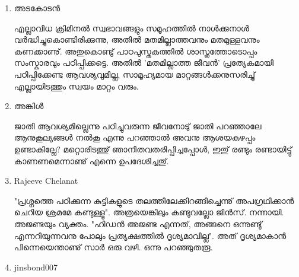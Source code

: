 \begin{enumerate}

\item{അടകോടന്‍}

എല്ലാവിധ ക്രിമിനല്‍ സ്വഭാവങ്ങളും സമൂഹത്തില്‍ നാള്‍ക്കുനാള്‍ വര്‍ദ്ധിച്ചുകൊണ്ടിരിക്കുന്നു, 
അതില്‍ മതമില്ലാത്തവനും മതമുള്ളവനും കണക്കാണു്. അതുകൊണ്ടു് പാഠപുസ്തകത്തില്‍ ശാസ്ത്രത്തോടൊപ്പം സംസ്കാരവും 
പഠിപ്പിക്കട്ടെ. അതില്‍ 'മതമില്ലാത്ത ജീവന്‍' പ്രത്യേകമായി പഠിപ്പിക്കേണ്ട ആവശ്യവുമില്ല, സാമൂഹ്യമായ മാറ്റങ്ങള്‍ക്കനുസരിച്ചു് 
എല്ലായിടത്തും സ്വയം മാറ്റം വരും.

\item{അങ്കിള്‍}

ജാതി ആവശ്യമില്ലെന്നു പഠിച്ചുവരുന്ന ജീവനോടു് ജാതി പറഞ്ഞാലേ ആനുകൂല്യങ്ങള്‍ നല്‍കൂ എന്നു പറഞ്ഞാല്‍ അവനു 
ആശയകുഴപ്പം ഉണ്ടാകില്ലേ? മറ്റൊരിടത്തു് ഞാനിതവതരിപ്പിച്ചപ്പോള്‍, ഇതു് രണ്ടും രണ്ടായിട്ടു് കാണണമെന്നാണു് എന്നെ 
ഉപദേശിച്ചതു്.

\item{Rajeeve Chelanat}

"പ്രശ്നത്തെ പഠിക്കുന്ന കുട്ടികളുടെ തലത്തിലേക്കിറങ്ങിച്ചെന്നു് അപഗ്രഥിക്കാന്‍ ചെറിയ ശ്രമമേ കണ്ടുള്ളൂ". അത്രയെങ്കിലും 
കണ്ടുവല്ലോ ജിന്‍സ്. നന്നായി. അജണ്ടയും വ്യക്തം. "ഹിഡന്‍ അജണ്ട എന്നത്, അങ്ങനെ ഒന്നുണ്ടു് എന്നറിയുന്നവനു 
പോലും പ്രത്യക്ഷത്തില്‍ ദൃശ്യമാവില്ല". അത് ദൃശ്യമാകാന്‍ പിന്നെയെന്താണു് സാര്‍ ഒരു വഴി. ഒന്നു പറഞ്ഞുതരൂ.

\item{jinsbond007}


\end{enumerate}
